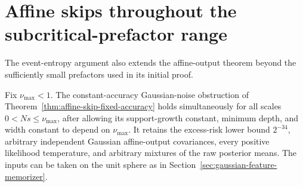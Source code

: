 \section{Affine skips throughout the subcritical-prefactor range}
\label{sec:subcritical-prefactor-affine}
The event-entropy argument also extends the affine-output theorem beyond the sufficiently small prefactors used in its initial proof.

\begin{corollary}
\label{cor:subcritical-prefactor-affine}
Fix $\nu_{\max}<1$. The constant-accuracy Gaussian-noise obstruction of Theorem~\ref{thm:affine-skip-fixed-accuracy} holds simultaneously for all scales $0<Ns\le\nu_{\max}$, after allowing its support-growth constant, minimum depth, and width constant to depend on $\nu_{\max}$. It retains the excess-risk lower bound $2^{-34}$, arbitrary independent Gaussian affine-output covariances, every positive likelihood temperature, and arbitrary mixtures of the raw posterior means. The inputs can be taken on the unit sphere as in Section~\ref{sec:gaussian-feature-memorizer}.
\end{corollary}
